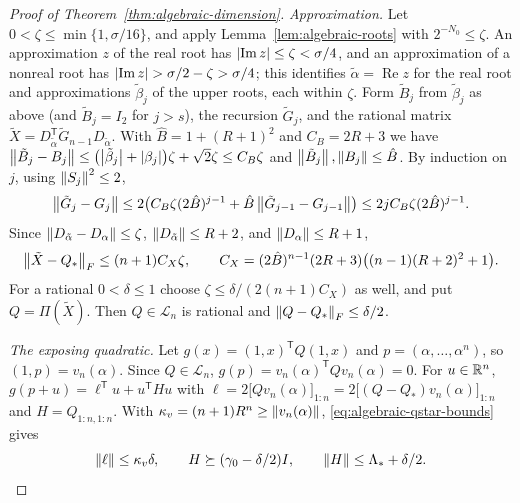 \begin{proof}[Proof of Theorem~\ref{thm:algebraic-dimension}]
\emph{Approximation.} Let $0<\zeta\le\min\{1,\sigma/16\}$, and apply
Lemma~\ref{lem:algebraic-roots} with $2^{-N_0}\le\zeta$. An approximation
$z$ of the real root has $\left\lvert\operatorname{Im}z\right\rvert\le\zeta<\sigma/4$, and an
approximation of a nonreal root has $\left\lvert\operatorname{Im}z\right\rvert>\sigma/2-\zeta
>\sigma/4$; this identifies $\tilde\alpha=\operatorname{Re}z$ for the real
root and approximations $\tilde\beta_j$ of the upper roots, each within
$\zeta$. Form $\tilde B_j$ from $\tilde\beta_j$ as above (and $\tilde B_j=I_2$
for $j>s$), the recursion $\tilde G_j$, and the rational matrix
$\tilde X=D_{\tilde\alpha}^{\mathsf T}\tilde G_{n-1}D_{\tilde\alpha}$. With
$\hat B=1+(R+1)^2$ and $C_B=2R+3$ we have
$\left\lVert\tilde B_j-B_j\right\rVert\le\bigl(\left\lvert\tilde\beta_j\right\rvert+\left\lvert\beta_j\right\rvert\bigr)\zeta
+\sqrt2\zeta\le C_B\zeta$ and $\left\lVert\tilde B_j\right\rVert,\left\lVert B_j\right\rVert\le\hat B$. By
induction on $j$, using $\left\lVert S_j\right\rVert^2\le2$,
\[
 \left\lVert\tilde G_j-G_j\right\rVert\le2\bigl(C_B\zeta(2\hat B)^{j-1}
   +\hat B\left\lVert\tilde G_{j-1}-G_{j-1}\right\rVert\bigr)\le2jC_B\zeta(2\hat B)^{j-1}.
\]
Since $\left\lVert D_{\tilde\alpha}-D_\alpha\right\rVert\le\zeta$, $\left\lVert D_{\tilde\alpha}\right\rVert\le
R+2$, and $\left\lVert D_\alpha\right\rVert\le R+1$,
\[
 \left\lVert\tilde X-Q_*\right\rVert_F\le(n+1)C_X\zeta,\qquad
 C_X=(2\hat B)^{n-1}(2R+3)\bigl((n-1)(R+2)^2+1\bigr).
\]
For a rational $0<\delta\le1$ choose $\zeta\le\delta/(2(n+1)C_X)$ as well, and
put $Q=\Pi(\tilde X)$. Then $Q\in\mathcal L_n$ is rational and
$\left\lVert Q-Q_*\right\rVert_F\le\delta/2$.

\emph{The exposing quadratic.} Let $g(x)=(1,x)^{\mathsf T}Q(1,x)$ and
$p=(\alpha,\ldots,\alpha^n)$, so $(1,p)=v_n(\alpha)$. Since
$Q\in\mathcal L_n$, $g(p)=v_n(\alpha)^{\mathsf T}Qv_n(\alpha)=0$. For
$u\in\mathbb R^n$, $g(p+u)=\ell^{\mathsf T}u+u^{\mathsf T}Hu$ with
$\ell=2\bigl[Qv_n(\alpha)\bigr]_{1:n}=2\bigl[(Q-Q_*)v_n(\alpha)\bigr]_{1:n}$ and
$H=Q_{1:n,1:n}$. With $\kappa_v=(n+1)R^n\ge\left\lVert v_n(\alpha)\right\rVert$,
\eqref{eq:algebraic-qstar-bounds} gives
\begin{equation}
 \left\lVert\ell\right\rVert\le\kappa_v\delta,\qquad H\succeq(\gamma_0-\delta/2)I,\qquad
 \left\lVert H\right\rVert\le\Lambda_*+\delta/2.
 \label{eq:algebraic-exposing-bounds}
\end{equation}


\end{proof}
